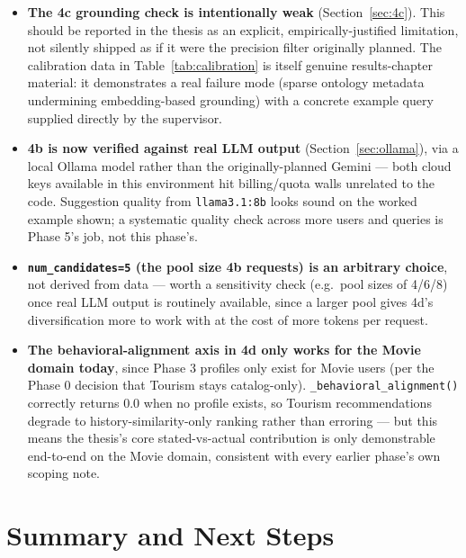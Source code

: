 \documentclass[11pt,a4paper]{article}
\newcommand{\code}[1]{\texttt{#1}}
\begin{document}
\begin{itemize}
    \item \textbf{The 4c grounding check is intentionally weak} (Section~\ref{sec:4c}). This
        should be reported in the thesis as an explicit, empirically-justified limitation, not
        silently shipped as if it were the precision filter originally planned. The calibration
        data in Table~\ref{tab:calibration} is itself genuine results-chapter material: it
        demonstrates a real failure mode (sparse ontology metadata undermining embedding-based
        grounding) with a concrete example query supplied directly by the supervisor.
    \item \textbf{4b is now verified against real LLM output} (Section~\ref{sec:ollama}), via a
        local Ollama model rather than the originally-planned Gemini --- both cloud keys available
        in this environment hit billing/quota walls unrelated to the code. Suggestion quality from
        \code{llama3.1:8b} looks sound on the worked example shown; a systematic quality check
        across more users and queries is Phase 5's job, not this phase's.
    \item \textbf{\code{num\_candidates=5} (the pool size 4b requests) is an arbitrary choice}, not
        derived from data --- worth a sensitivity check (e.g.\ pool sizes of 4/6/8) once real LLM
        output is routinely available, since a larger pool gives 4d's diversification more to work
        with at the cost of more tokens per request.
    \item \textbf{The behavioral-alignment axis in 4d only works for the Movie domain today},
        since Phase 3 profiles only exist for Movie users (per the Phase 0 decision that Tourism
        stays catalog-only). \code{\_behavioral\_alignment()} correctly returns $0.0$ when no
        profile exists, so Tourism recommendations degrade to history-similarity-only ranking
        rather than erroring --- but this means the thesis's core stated-vs-actual contribution is
        only demonstrable end-to-end on the Movie domain, consistent with every earlier phase's own
        scoping note.
\end{itemize}

\section{Summary and Next Steps}
\end{document}
